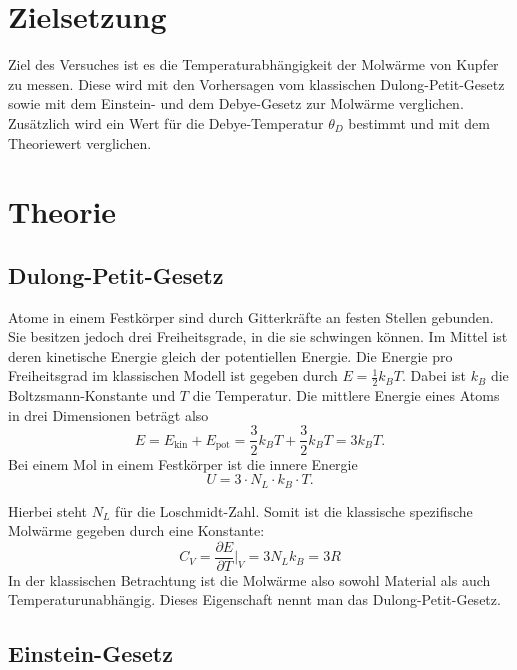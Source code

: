 \section{Zielsetzung}
\label{sec:Zielsetzung}

Ziel des Versuches ist es die Temperaturabhängigkeit der Molwärme von Kupfer zu messen. Diese wird mit den Vorhersagen 
vom klassischen Dulong-Petit-Gesetz sowie mit dem Einstein- und dem Debye-Gesetz zur Molwärme verglichen. Zusätzlich wird ein Wert für die Debye-Temperatur $\theta_D$ bestimmt und mit dem Theoriewert verglichen.


\section{Theorie}
\label{sec:Theorie}

\subsection{Dulong-Petit-Gesetz}
\label{sec:dulongpetit}

Atome in einem Festkörper sind durch Gitterkräfte an festen Stellen gebunden. Sie besitzen jedoch drei Freiheitsgrade, in die sie schwingen können. 
Im Mittel ist deren kinetische Energie gleich der potentiellen Energie. Die Energie pro Freiheitsgrad im klassischen Modell ist gegeben durch 
$E = \frac{1}{2}k_B T$. Dabei ist $k_B$ die Boltzsmann-Konstante und $T$ die Temperatur. Die mittlere Energie eines Atoms in drei Dimensionen beträgt also 
\begin{equation*}
    E = E_{\text{kin}} + E_{\text{pot}} = \frac{3}{2}k_B T + \frac{3}{2}k_B T = 3k_B T.
\end{equation*}
Bei einem Mol in einem Festkörper ist die innere Energie 
\begin{equation*}
    U = 3 \cdot N_L\cdot k_B \cdot T.
\end{equation*}

Hierbei steht $N_L$ für die Loschmidt-Zahl. Somit ist die klassische spezifische Molwärme gegeben durch eine Konstante:
\begin{equation}
    C_V = \frac{\partial E}{\partial T} \bigg\vert_V = 3 N_L k_B = 3 R
\end{equation}
In der klassischen Betrachtung ist die Molwärme also sowohl Material als auch Temperaturunabhängig. Dieses Eigenschaft nennt man das Dulong-Petit-Gesetz.
\subsection{Einstein-Gesetz}
\label{sec:einstein}

